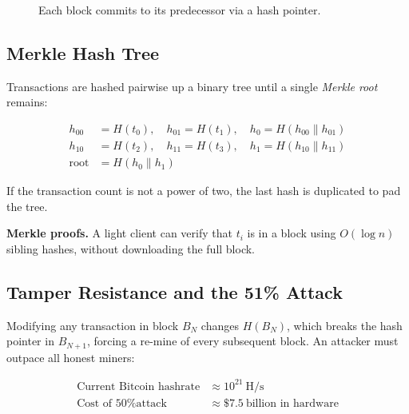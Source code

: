\documentclass[12pt,a4paper,openany]{book}
\theoremstyle{definition}
\theoremstyle{plain}
\theoremstyle{remark}
\begin{document}
\begin{figure}[h]
\centering
{}
\caption{Each block commits to its predecessor via a hash pointer.}
\label{fig:chain}
\end{figure}

\subsection{Merkle Hash Tree}

Transactions are hashed pairwise up a binary tree until a single
\emph{Merkle root} remains:

\begin{align}
  h_{00} &= H(t_0),\quad h_{01} = H(t_1),\quad h_0 = H(h_{00}\|h_{01}) \\
  h_{10} &= H(t_2),\quad h_{11} = H(t_3),\quad h_1 = H(h_{10}\|h_{11}) \\
  \text{root} &= H(h_0\|h_1)
\end{align}

If the transaction count is not a power of two, the last hash is
duplicated to pad the tree.

\textbf{Merkle proofs.}  A light client can verify that $t_i$ is in a
block using $O(\log n)$ sibling hashes, without downloading the full
block.

\subsection{Tamper Resistance and the 51\% Attack}

Modifying any transaction in block $B_N$ changes $H(B_N)$, which breaks
the hash pointer in $B_{N+1}$, forcing a re-mine of every subsequent
block.  An attacker must outpace all honest miners:

\begin{align}
  \text{Current Bitcoin hashrate} &\approx 10^{21}\ \text{H/s} \\
  \text{Cost of 50\% attack} &\approx \$7.5\ \text{billion in hardware}
\end{align}
\end{document}
